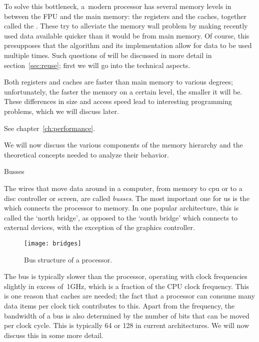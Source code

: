 To solve this bottleneck,
a~modern processor has several memory levels in between the
\ac{FPU} and the main memory: the registers
and the caches, together called the
. These try to alleviate the memory
wall problem by making recently used data available quicker than it
would be from main memory. Of course, this presupposes that the
algorithm and its implementation allow for data to be used multiple
times.
Such questions of  will be discussed in
more detail in section~\ref{sec:reuse};
first we will go into the technical aspects.


Both registers and caches are faster
than main memory to various degrees; unfortunately, the faster the memory on a certain
level, the smaller it will be.
These differences in size and access speed lead to interesting programming
problems, which we will discuss later.
\begin{nopackt}
See chapter~\ref{ch:performance}.  
\end{nopackt}

We will now discuss the various components of the memory hierarchy and
the theoretical concepts needed to analyze their behavior.

 {Busses}

The wires that move data around in a computer, from memory to cpu or
to a disc controller or screen, are called \emph{busses}. The
most important one for us is the  which connects the processor to memory. In one popular
architecture, this is called the `north bridge', as opposed to the
`south bridge' which connects to external devices, with the exception
of the graphics controller.

\begin{figure}[ht]
\texttt{[image: bridges]}
\caption{Bus structure of a processor.}
\end{figure}

The bus is typically slower than the processor, operating with clock
frequencies slightly in excess of~1GHz, which is a fraction of the \ac{CPU}
clock frequency.  This is one reason that caches are needed; the fact
that a processor can consume many data items per clock tick
contributes to this. Apart from the frequency, the bandwidth of a bus is
also determined by the number of bits that can be moved per clock
cycle. This is typically 64 or 128 in current architectures. We will
now discuss this in some more detail.

